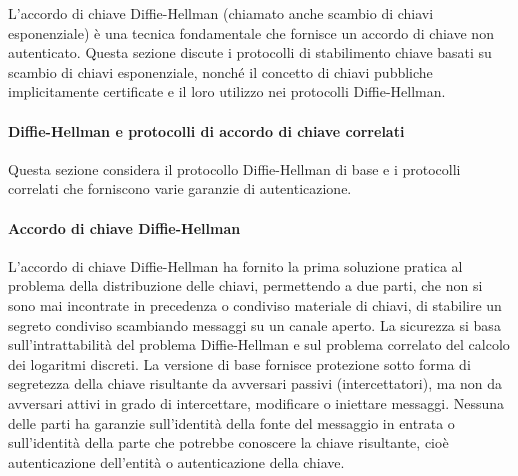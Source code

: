\documentclass{article}
\theoremstyle{definition}
\begin{document}
L'accordo di chiave Diffie-Hellman (chiamato anche scambio di chiavi esponenziale) è una tecnica fondamentale che fornisce un accordo di chiave non autenticato. Questa sezione discute i protocolli di stabilimento chiave basati su scambio di chiavi esponenziale, nonché il concetto di chiavi pubbliche implicitamente certificate e il loro utilizzo nei protocolli Diffie-Hellman.

\paragraph{Diffie-Hellman e protocolli di accordo di chiave correlati}

Questa sezione considera il protocollo Diffie-Hellman di base e i protocolli correlati che forniscono varie garanzie di autenticazione.

\paragraph{Accordo di chiave Diffie-Hellman}
L'accordo di chiave Diffie-Hellman ha fornito la prima soluzione pratica al problema della distribuzione delle chiavi, permettendo a due parti, che non si sono mai incontrate in precedenza o condiviso materiale di chiavi, di stabilire un segreto condiviso scambiando messaggi su un canale aperto. La sicurezza si basa sull'intrattabilità del problema Diffie-Hellman e sul problema correlato del calcolo dei logaritmi discreti. La versione di base fornisce protezione sotto forma di segretezza della chiave risultante da avversari passivi (intercettatori), ma non da avversari attivi in grado di intercettare, modificare o iniettare messaggi. Nessuna delle parti ha garanzie sull'identità della fonte del messaggio in entrata o sull'identità della parte che potrebbe conoscere la chiave risultante, cioè autenticazione dell'entità o autenticazione della chiave.
\end{document}
